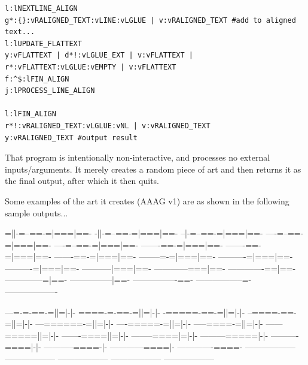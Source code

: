 \documentclass[a4paper, 18pt]{book} %
\begin{document}
{{{{\begin{tcolorbox}[teaterminalstyle, title=TEA Program: ABSTRACT ASCII-ART GENERATOR v1, breakable]
\begin{lstlisting}[language=TEA,breaklines=true,]
l:lNEXTLINE_ALIGN
g*:{}:vRALIGNED_TEXT:vLINE:vLGLUE | v:vRALIGNED_TEXT #add to aligned text...
l:lUPDATE_FLATTEXT
y:vFLATTEXT | d*!:vLGLUE_EXT | v:vFLATTEXT | r*:vFLATTEXT:vLGLUE:vEMPTY | v:vFLATTEXT
f:^$:lFIN_ALIGN
j:lPROCESS_LINE_ALIGN

l:lFIN_ALIGN
r*!:vRALIGNED_TEXT:vLGLUE:vNL | v:vRALIGNED_TEXT
y:vRALIGNED_TEXT #output result
   \end{lstlisting}
  \end{tcolorbox}
  \caption{TEA APPLICATION: ABSTRACT ASCII-ART GENERATOR (AAAG) v1}
  \label{FIGT1}
}


\vspace{2em}


That program is intentionally non-interactive, and processes no external inputs/arguments. It merely creates a random piece of art and then returns it as the final output, after which it then quits.

\vspace{2em}

Some examples of the art it creates (AAAG v1) are as shown in the following sample outputs...


\vspace{2em}

\newpage

     \begin{tcbverbatim}[title=Sample OUTPUT 1 from AAAG v1]
=||-=--==-=|===|==-
-||-=--==-=|===|==-
--|-=--==-=|===|==-
----=--==-=|===|==-
----=--==-=|===|==-
-------==-=|===|==-
-------==-=|===|==-
-------==-=|===|==-
--------=-=|===|==-
----------=|===|==-
----------=|===|==-
-----------|===|==-
------------===|==-
-------------==|==-
--------------=|==-
---------------|==-
----------------==-
-----------------=-
-------------------
  \end{tcbverbatim}

\vspace{1em}


\newpage

     \begin{tcbverbatim}[title=Sample OUTPUT 2 from AAAG v1]
---=-=-==-=||=|-|-
====-=-==-=||=|-|-
-=====-==-=||=|-|-
--====-==-=||=|-|-
---======-=||=|-|-
----=====-=||=|-|-
-----====-=||=|-|-
------=====||=|-|-
-------====||=|-|-
--------====|=|-|-
---------=====|-|-
----------====|-|-
-----------====-|-
------------====|-
-------------====-
------------------
------------------
------------------
------------------
------------------
  \end{tcbverbatim}

}}}
\end{document}
